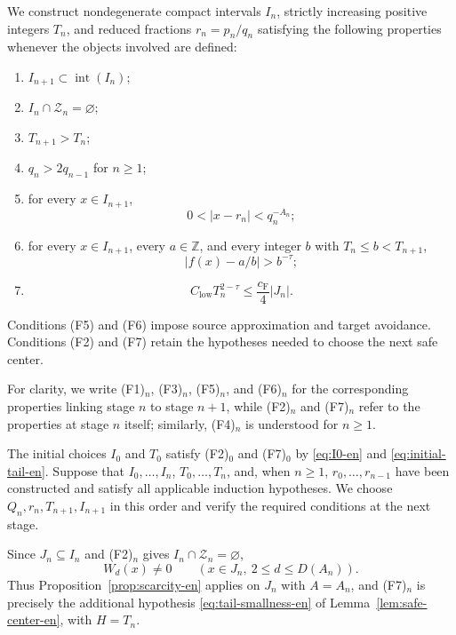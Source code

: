 \documentclass[11pt]{amsart}
\numberwithin{equation}{section}
\theoremstyle{definition}
\theoremstyle{remark}
\newcommand{\Z}{\mathbb Z}
\newcommand{\Int}{\operatorname{int}}
\newcommand{\abs}[1]{\left\lvert #1\right\rvert}
\begin{document}
We construct nondegenerate compact intervals $I_n$, strictly
increasing positive integers $T_n$, and reduced fractions
$r_n=p_n/q_n$ satisfying the following properties whenever the objects
involved are defined:
\begin{enumerate}[label=\textup{(F\arabic*)},leftmargin=3em]
\item $I_{n+1}\subset\Int(I_n)$;
\item $I_n\cap\mathcal Z_n=\varnothing$;
\item $T_{n+1}>T_n$;
\item $q_n>2q_{n-1}$ for $n\geq1$;
\item for every $x\in I_{n+1}$,
\begin{equation}\label{eq:source-invariant-en}
0<\abs{x-r_n}<q_n^{-A_n};
\end{equation}
\item for every $x\in I_{n+1}$, every $a\in\Z$, and every integer $b$
with $T_n\leq b<T_{n+1}$,
\begin{equation}\label{eq:target-invariant-en}
\abs{f(x)-a/b}>b^{-\tau};
\end{equation}
\item
\begin{equation}\label{eq:tail-invariant-en}
C_{\mathrm{low}}T_n^{2-\tau}
\leq
\frac{c_{\mathrm F}}4|J_n|.
\end{equation}
\end{enumerate}
Conditions (F5) and (F6) impose source approximation and target
avoidance. Conditions (F2) and (F7) retain the hypotheses needed
to choose the next safe center.

For clarity, we write \textup{(F1)}$_n$, \textup{(F3)}$_n$,
\textup{(F5)}$_n$, and \textup{(F6)}$_n$ for the corresponding
properties linking stage $n$ to stage $n+1$, while
\textup{(F2)}$_n$ and \textup{(F7)}$_n$ refer to the properties at
stage $n$ itself; similarly, \textup{(F4)}$_n$ is understood for
$n\geq1$.

The initial choices $I_0$ and $T_0$ satisfy
\textup{(F2)}$_0$ and \textup{(F7)}$_0$ by
\eqref{eq:I0-en} and \eqref{eq:initial-tail-en}. Suppose that $I_0,\ldots,I_n$, $T_0,\ldots,T_n$, and, when
$n\geq1$, $r_0,\ldots,r_{n-1}$ have been constructed and satisfy
all applicable induction hypotheses. We choose
$Q_n,r_n,T_{n+1},I_{n+1}$ in this order and verify the required
conditions at the next stage.

Since $J_n\subseteq I_n$ and
\textup{(F2)}$_n$ gives $I_n\cap\mathcal Z_n=\varnothing$,
\[
W_d(x)\neq0
\qquad(x\in J_n,\ 2\leq d\leq D(A_n)).
\]
Thus Proposition~\ref{prop:scarcity-en} applies on $J_n$ with
$A=A_n$, and \textup{(F7)}$_n$ is precisely the additional hypothesis
\eqref{eq:tail-smallness-en} of Lemma~\ref{lem:safe-center-en}, with
$H=T_n$.
\end{document}
